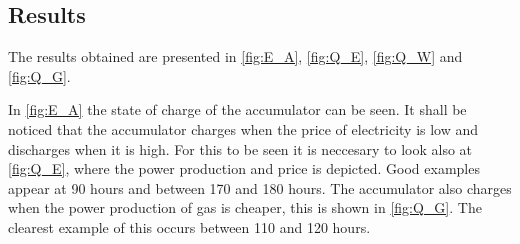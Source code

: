 \subsection*{Results}
The results obtained are presented in \autoref{fig:E_A}, \ref{fig:Q_E}, \ref{fig:Q_W} and \ref{fig:Q_G}.

In \autoref{fig:E_A} the state of charge of the accumulator can be seen. It shall be noticed that the accumulator charges when the price of electricity is low and discharges when it is high. For this to be seen it is neccesary to look also at \autoref{fig:Q_E}, where the power production and price is depicted. Good examples appear at 90 hours and between 170 and 180 hours. The accumulator also charges when the power production of gas is cheaper, this is shown in \autoref{fig:Q_G}. The clearest example of this occurs between 110 and 120 hours.

